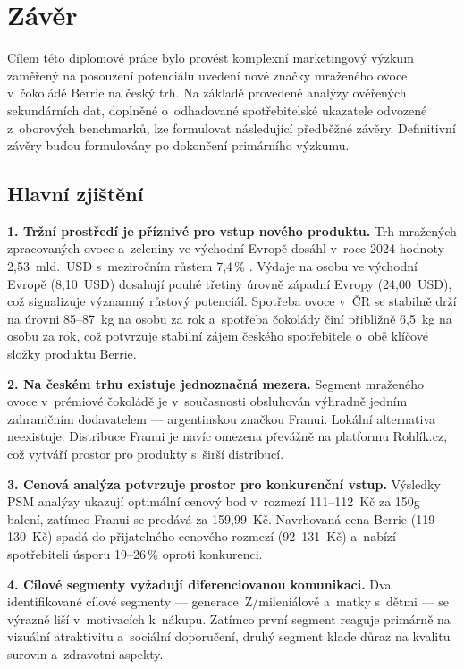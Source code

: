 \chapter{Závěr}
\label{chap:conclusion}

Cílem této diplomové práce bylo provést komplexní marketingový výzkum zaměřený na posouzení potenciálu uvedení nové značky mraženého ovoce v~čokoládě Berrie na český trh. Na základě provedené analýzy ověřených sekundárních dat, doplněné o~odhadované spotřebitelské ukazatele odvozené z~oborových benchmarků, lze formulovat následující předběžné závěry. Definitivní závěry budou formulovány po dokončení primárního výzkumu.

\section{Hlavní zjištění}

\textbf{1. Tržní prostředí je příznivé pro vstup nového produktu.} Trh mražených zpracovaných ovoce a~zeleniny ve východní Evropě dosáhl v~roce 2024 hodnoty 2,53~mld.~USD s~meziročním růstem 7,4\,\% \parencite{frozenfoodeurope_2025}. Výdaje na osobu ve východní Evropě (8,10~USD) dosahují pouhé třetiny úrovně západní Evropy (24,00~USD), což signalizuje významný růstový potenciál. Spotřeba ovoce v~ČR se stabilně drží na úrovni 85--87~kg na osobu za rok \parencite{czso_spotreba_2024} a~spotřeba čokolády činí přibližně 6,5~kg na osobu za rok, což potvrzuje stabilní zájem českého spotřebitele o~obě klíčové složky produktu Berrie.

\textbf{2. Na českém trhu existuje jednoznačná mezera.} Segment mraženého ovoce v~prémiové čokoládě je v~současnosti obsluhován výhradně jedním zahraničním dodavatelem — argentinskou značkou Franui. Lokální alternativa neexistuje. Distribuce Franui je navíc omezena převážně na platformu Rohlík.cz, což vytváří prostor pro produkty s~širší distribucí.

\textbf{3. Cenová analýza potvrzuje prostor pro konkurenční vstup.} Výsledky PSM analýzy ukazují optimální cenový bod v~rozmezí 111--112~Kč za 150g balení, zatímco Franui se prodává za 159,99~Kč. Navrhovaná cena Berrie (119--130~Kč) spadá do přijatelného cenového rozmezí (92--131~Kč) a~nabízí spotřebiteli úsporu 19--26\,\% oproti konkurenci.

\textbf{4. Cílové segmenty vyžadují diferenciovanou komunikaci.} Dva identifikované cílové segmenty — generace~Z/mileniálové a~matky s~dětmi — se výrazně liší v~motivacích k~nákupu. Zatímco první segment reaguje primárně na vizuální atraktivitu a~sociální doporučení, druhý segment klade důraz na kvalitu surovin a~zdravotní aspekty.

